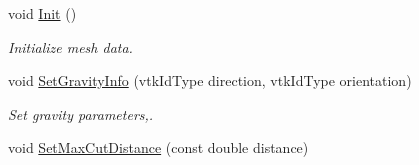 \begin{DoxyCompactItemize}
void \hyperlink{classvtkOrgan_a48aa20d7255903b3f7ac5cd2a4adec8c}{Init} ()
\begin{DoxyCompactList}\small\item\em Initialize mesh data. \item\end{DoxyCompactList}\item 
void \hyperlink{classvtkOrgan_ae3f6ea53f0d615fae5f9e2796e4075a2}{SetGravityInfo} (vtkIdType direction, vtkIdType orientation)
\begin{DoxyCompactList}\small\item\em Set gravity parameters,. \item\end{DoxyCompactList}\item 
\hypertarget{classvtkOrgan_a4a91419279ab9b51f657f7d0cf613a0c}{
void \hyperlink{classvtkOrgan_a4a91419279ab9b51f657f7d0cf613a0c}{SetMaxCutDistance} (const double distance)}
\label{classvtkOrgan_a4a91419279ab9b51f657f7d0cf613a0c}


\end{DoxyCompactItemize}
